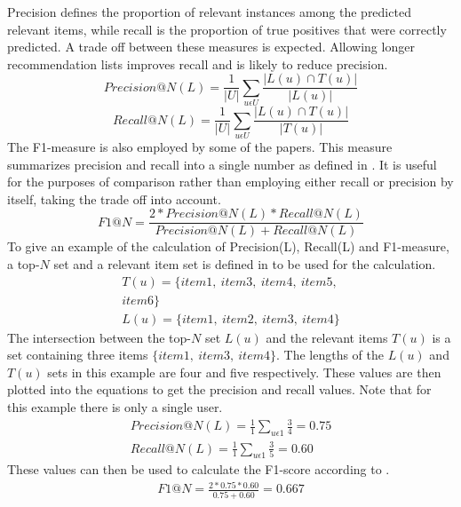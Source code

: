 Precision defines the proportion of relevant instances among the predicted relevant items, while recall is the proportion of true positives that were correctly predicted.
A trade off between these measures is expected.
Allowing longer recommendation lists improves recall and is likely to reduce precision\cite{RecommenderHandbook2015}.
\begin{equation}
    \label{eqn:precision}
    Precision@N(L) = \frac{1}{|U|} \sum\limits_{u \epsilon U}\frac{|L(u) \cap T(u)|}{|L(u)|}
\end{equation}
\begin{equation}
    \label{eqn:recall}
    Recall@N(L) = \frac{1}{|U|} \sum\limits_{u \epsilon U} \frac{|L(u) \cap T(u)|}{|T(u)|}
\end{equation}
The F1-measure is also employed by some of the papers.
This measure summarizes precision and recall into a single number as defined in .
It is useful for the purposes of comparison rather than employing either recall or precision by itself, taking the trade off into account.
\begin{equation}
    \label{eqn:f1}
    F1@N = \frac{2*Precision@N(L)*Recall@N(L)}{Precision@N(L)+Recall@N(L)}
\end{equation}
To give an example of the calculation of Precision(L), Recall(L) and F1-measure, a top-$N$ set and a relevant item set is defined in  to be used for the calculation.
\begin{align}
    T(u) = \{item1, \: item3, \: item4, \: item5,\nonumber \\
     item6\} \nonumber \\
    L(u) = \{item1, \: item2, \: item3, \: item4\}\label{eqn:item-lists}
\end{align}
The intersection between the top-$N$ set $L(u)$ and the relevant items $T(u)$ is a set containing three items $\{item1, \: item3, \: item4\}$.
The lengths of the $L(u)$ and $T(u)$ sets in this example are four and five respectively.
These values are then plotted into the equations to get the precision and recall values.
Note that for this example there is only a single user.
\begin{align*}
    Precision@N(L) = \frac{1}{1} \sum\limits_{u \epsilon 1}\frac{3}{4} = 0.75\\
    Recall@N(L) = \frac{1}{1} \sum\limits_{u \epsilon 1} \frac{3}{5} = 0.60
\end{align*}
These values can then be used to calculate the F1-score according to .
\begin{align*}
    F1@N = \frac{2*0.75*0.60}{0.75+0.60} = 0.667
\end{align*}
